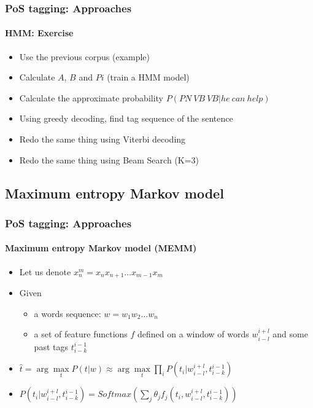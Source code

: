 \documentclass[xcolor=table]{beamer}
\begin{document}
\begin{frame}
	\frametitle{PoS tagging: Approaches}
	\framesubtitle{HMM: Exercise}
	
	\begin{itemize}
		\item Use the previous corpus (example)
		\item Calculate $A$, $B$ and $Pi$ (train a HMM model)
		\item Calculate the approximate probability $P(PN\ VB\ VB | he\ can\ help)$
		\item Using greedy decoding, find tag sequence of the sentence 
		\item Redo the same thing using Viterbi decoding
		\item Redo the same thing using Beam Search (K=3)
	\end{itemize}
	
\end{frame}

\subsection{Maximum entropy Markov model}

\begin{frame}
\frametitle{PoS tagging: Approaches}
\framesubtitle{Maximum entropy Markov model (MEMM)}

\begin{itemize}
	\item Let us denote $x_{n}^{m} = x_n x_{n+1} \ldots x_{m-1} x_m$
	\item Given  
	\begin{itemize}
		\item a words sequence: $w = w_1 w_2 \ldots w_n$
		\item a set of feature functions $f$ defined on a window of words $w_{i-l}^{i+l}$ and some past tags $t_{i-k}^{i-1}$
	\end{itemize}
	\item $\hat{t} = \arg\max\limits_t P(t | w) \approx \arg\max\limits_t \prod\limits_{i}  P(t_i | w_{i-l}^{i+l}, t_{i-k}^{i-1})$
	\item $P(t_i | w_{i-l}^{i+l}, t_{i-k}^{i-1}) = Softmax(\sum_j \theta_j f_j(t_i, w_{i-l}^{i+l}, t_{i-k}^{i-1}))$
\end{itemize}

\end{frame}
\end{document}
